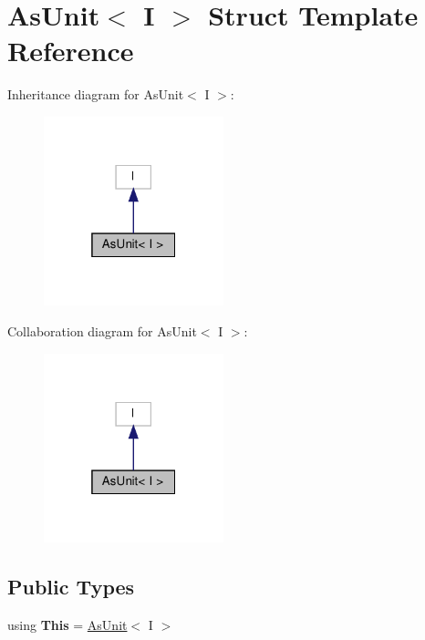 \hypertarget{structAsUnit}{}\section{As\+Unit$<$ I $>$ Struct Template Reference}
\label{structAsUnit}


Inheritance diagram for As\+Unit$<$ I $>$\+:
\nopagebreak
\begin{figure}[H]
\begin{center}
\leavevmode
\includegraphics[width=148pt]{structAsUnit__inherit__graph}
\end{center}
\end{figure}


Collaboration diagram for As\+Unit$<$ I $>$\+:
\nopagebreak
\begin{figure}[H]
\begin{center}
\leavevmode
\includegraphics[width=148pt]{structAsUnit__coll__graph}
\end{center}
\end{figure}
\subsection*{Public Types}
\begin{DoxyCompactItemize}
\item 
\mbox{\label{structAsUnit_a025932fdf9b0f80c22edfd96d9cc28a5}} 
using {\bfseries This} = \hyperlink{structAsUnit}{As\+Unit}$<$ I $>$
\end{DoxyCompactItemize}
